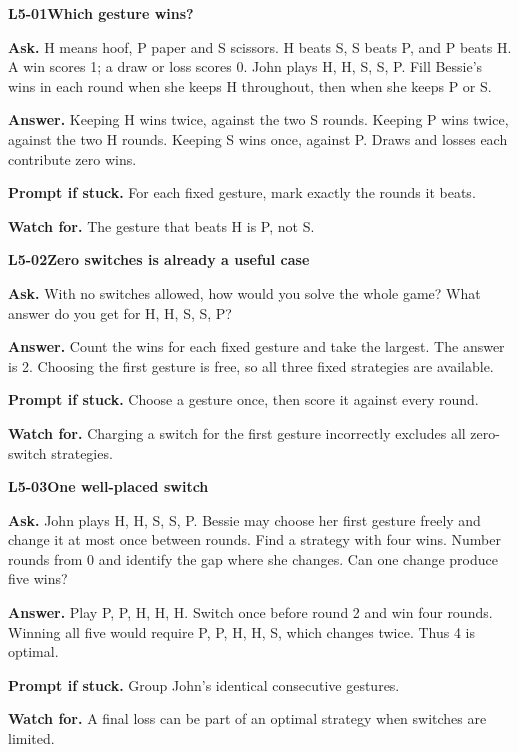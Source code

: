 \documentclass[11pt,a4paper]{article}
\begin{document}
\noindent\begin{minipage}{\textwidth}
{\color{teal}\textbf{L5-01}}\quad \textbf{Which gesture wins?}\par\smallskip
\textbf{Ask.} H means hoof, P paper and S scissors. H beats S, S beats P, and P beats H. A win scores 1; a draw or loss scores 0. John plays H, H, S, S, P. Fill Bessie's wins in each round when she keeps H throughout, then when she keeps P or S.\par\smallskip
\textbf{Answer.} Keeping H wins twice, against the two S rounds. Keeping P wins twice, against the two H rounds. Keeping S wins once, against P. Draws and losses each contribute zero wins.\par\smallskip
\textbf{Prompt if stuck.} For each fixed gesture, mark exactly the rounds it beats.\par\smallskip
\textbf{Watch for.} The gesture that beats H is P, not S.
\end{minipage}\par{}\medskip

\noindent\begin{minipage}{\textwidth}
{\color{teal}\textbf{L5-02}}\quad \textbf{Zero switches is already a useful case}\par\smallskip
\textbf{Ask.} With no switches allowed, how would you solve the whole game? What answer do you get for H, H, S, S, P?\par\smallskip
\textbf{Answer.} Count the wins for each fixed gesture and take the largest. The answer is 2. Choosing the first gesture is free, so all three fixed strategies are available.\par\smallskip
\textbf{Prompt if stuck.} Choose a gesture once, then score it against every round.\par\smallskip
\textbf{Watch for.} Charging a switch for the first gesture incorrectly excludes all zero-switch strategies.
\end{minipage}\par{}\medskip

\noindent\begin{minipage}{\textwidth}
{\color{teal}\textbf{L5-03}}\quad \textbf{One well-placed switch}\par\smallskip
\textbf{Ask.} John plays H, H, S, S, P. Bessie may choose her first gesture freely and change it at most once between rounds. Find a strategy with four wins. Number rounds from 0 and identify the gap where she changes. Can one change produce five wins?\par\smallskip
\textbf{Answer.} Play P, P, H, H, H. Switch once before round 2 and win four rounds. Winning all five would require P, P, H, H, S, which changes twice. Thus 4 is optimal.\par\smallskip
\textbf{Prompt if stuck.} Group John's identical consecutive gestures.\par\smallskip
\textbf{Watch for.} A final loss can be part of an optimal strategy when switches are limited.
\end{minipage}\par{}\medskip
\end{document}
